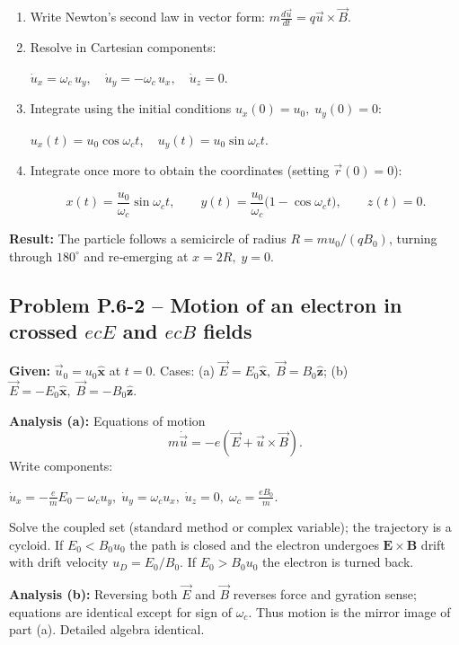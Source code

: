 \documentclass[12pt]{article}
\begin{document}
\begin{enumerate}
\item Write Newton’s second law in vector form:
      $m\frac{d\vec u}{dt}=q\vec u\times\vec B$.
\item Resolve in Cartesian components:

      $\displaystyle \dot u_x=\omega_c\,u_y,\quad \dot u_y=-\omega_c\,u_x,\quad \dot u_z=0$.

\item Integrate using the initial conditions $u_x(0)=u_0,\;u_y(0)=0$:

      $\displaystyle u_x(t)=u_0\cos\omega_c t,\quad u_y(t)=u_0\sin\omega_c t$.
\item Integrate once more to obtain the coordinates (setting $\vec r(0)=0$):

      \[
      x(t)=\frac{u_0}{\omega_c}\sin\omega_c t,\qquad
      y(t)=\frac{u_0}{\omega_c}\bigl(1-\cos\omega_c t\bigr),\qquad
      z(t)=0 .
      \]

\end{enumerate}

\textbf{Result:}  The particle follows a semicircle of radius $R=mu_0/(qB_0)$, turning through $180^{\circ}$ and re‑emerging at $x=2R,\;y=0$.

\bigskip
\subsection*{Problem P.6-2 – Motion of an electron in crossed $ec E$ and $ec B$ fields}

\textbf{Given:} $\vec u_0=u_0\hat{\mathbf x}$ at $t=0$.  Cases:  
(a) $\vec E=E_0\hat{\mathbf x},\;\vec B=B_0\hat{\mathbf z}$;  
(b) $\vec E=-E_0\hat{\mathbf x},\;\vec B=-B_0\hat{\mathbf z}$.

\textbf{Analysis (a):}  Equations of motion
\[
m\dot{\vec u}=-e(\vec E+\vec u\times\vec B).
\]
Write components:

$\dot u_x=-\frac{e}{m}E_0 -\omega_c u_y,\;
 \dot u_y=\omega_c u_x,\;
 \dot u_z=0,\;
\omega_c=\frac{eB_0}{m}$.

Solve the coupled set (standard method or complex variable); the trajectory is a cycloid.  
If $E_0< B_0u_0$ the path is closed and the electron undergoes $\mathbf{E}\times\mathbf{B}$ drift with drift velocity $u_D=E_0/B_0$.  
If $E_0> B_0u_0$ the electron is turned back.

\textbf{Analysis (b):}  Reversing both $\vec E$ and $\vec B$ reverses force and gyration sense; equations are identical except for sign of $\omega_c$.  
Thus motion is the mirror image of part (a).  Detailed algebra identical.
\end{document}
